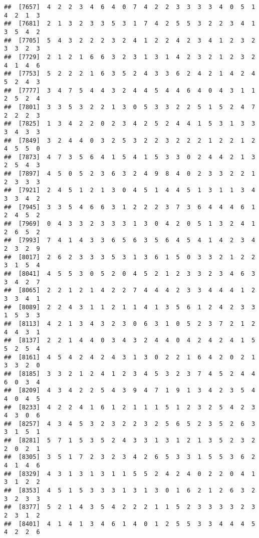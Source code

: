 \documentclass[
]{article}
\begin{document}
\begin{verbatim}
##  [7657]  4  2  2  3  4  6  4  0  7  4  2  2  3  3  3  3  4  0  5  1  4  2  1  3
##  [7681]  2  1  3  2  3  3  5  3  1  7  4  2  5  5  3  2  2  3  4  1  3  5  4  2
##  [7705]  5  4  3  2  2  2  3  2  4  1  2  2  4  2  3  4  1  2  3  2  3  3  2  3
##  [7729]  2  1  2  1  6  6  3  2  3  1  3  1  4  2  3  2  1  2  3  2  4  1  4  6
##  [7753]  5  2  2  2  1  6  3  5  2  4  3  3  6  2  4  2  1  4  2  4  5  2  4  3
##  [7777]  3  4  7  5  4  4  3  2  4  4  5  4  4  6  4  0  4  3  1  1  2  5  2  4
##  [7801]  3  3  5  3  2  2  1  3  0  5  3  3  2  2  5  1  5  2  4  7  2  2  2  3
##  [7825]  1  3  4  2  2  0  2  3  4  2  5  2  4  4  1  5  3  1  3  3  3  4  3  3
##  [7849]  3  2  4  4  0  3  2  5  3  2  2  3  2  2  2  1  2  2  1  2  4  5  5  0
##  [7873]  4  7  3  5  6  4  1  5  4  1  5  3  3  0  2  4  4  2  1  3  2  5  4  3
##  [7897]  4  5  0  5  2  3  6  3  2  4  9  8  4  0  2  3  3  2  2  1  2  3  3  3
##  [7921]  2  4  5  1  2  1  3  0  4  5  1  4  4  5  1  3  1  1  3  4  3  3  4  2
##  [7945]  3  3  5  4  6  6  3  1  2  2  2  3  7  3  6  4  4  4  6  1  2  4  5  2
##  [7969]  0  4  3  3  2  3  3  3  1  3  0  4  2  0  5  1  3  2  4  1  2  6  5  2
##  [7993]  7  4  1  4  3  3  6  5  6  3  5  6  4  5  4  1  4  2  3  4  2  3  2  9
##  [8017]  2  6  2  3  3  3  5  3  1  3  6  1  5  0  3  3  2  1  2  2  3  1  5  4
##  [8041]  4  5  5  3  0  5  2  0  4  5  2  1  2  3  3  2  3  4  6  3  3  4  2  7
##  [8065]  2  2  1  2  1  4  2  2  7  4  4  4  2  3  3  4  4  4  1  2  3  3  4  1
##  [8089]  2  2  4  3  1  1  2  1  1  4  1  3  5  6  1  2  4  2  3  3  1  5  3  3
##  [8113]  4  2  1  3  4  3  2  3  0  6  3  1  0  5  2  3  7  2  1  2  4  4  3  1
##  [8137]  2  2  1  4  4  0  3  4  3  2  4  4  0  4  2  4  2  4  1  5  5  2  5  4
##  [8161]  4  5  4  2  4  2  4  3  1  3  0  2  2  1  6  4  2  0  2  1  3  3  2  0
##  [8185]  3  3  2  1  2  4  1  2  3  4  5  3  2  3  7  4  5  2  4  4  6  0  3  4
##  [8209]  4  3  4  2  2  5  4  3  9  4  7  1  9  1  3  4  2  3  5  4  4  0  4  5
##  [8233]  4  2  2  4  1  6  1  2  1  1  1  5  1  2  3  2  5  4  2  3  4  3  0  6
##  [8257]  4  3  4  5  3  2  3  2  2  3  2  5  6  5  2  3  5  2  6  3  3  1  5  1
##  [8281]  5  7  1  5  3  5  2  4  3  3  1  3  1  2  1  3  5  2  3  2  2  0  2  1
##  [8305]  3  5  1  7  2  3  2  3  4  2  6  5  3  3  1  5  5  3  6  2  4  1  4  6
##  [8329]  4  3  1  3  1  3  1  1  5  5  2  4  2  4  0  2  2  0  4  1  3  1  2  2
##  [8353]  4  5  1  5  3  3  3  1  3  1  3  0  1  6  2  1  2  6  3  2  3  2  3  3
##  [8377]  5  2  1  4  3  5  4  2  2  2  1  1  5  2  3  3  3  3  2  3  2  3  1  2
##  [8401]  4  1  4  1  3  4  6  1  4  0  1  2  5  5  3  3  4  4  4  5  4  2  2  6

\end{verbatim}
\end{document}
